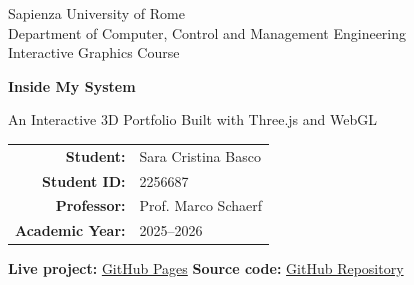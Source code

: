 \documentclass{report}
\begin{document}
\begin{titlepage}
    \thispagestyle{empty}

    \begin{center}

        \vspace{0.6cm}

        {\large
        Sapienza University of Rome\\
        Department of Computer, Control and Management Engineering\\
        Interactive Graphics Course
        }

        \vspace{1.8cm}

        {\fontsize{32}{38}\selectfont
        \bfseries
        \textcolor{projectdark}{Inside My System}
        }

        \vspace{0.35cm}

        {\Large
        \textcolor{projectgold}{
        An Interactive 3D Portfolio Built with Three.js and WebGL
        }
        }

        \vspace{1.3cm}

        \vfill

        \begin{tabular}{rl}
            \textbf{Student:} &
            Sara Cristina Basco \\[0.15cm]

            \textbf{Student ID:} &
            2256687 \\[0.15cm]

            \textbf{Professor:} &
            Prof. Marco Schaerf \\[0.15cm]

            \textbf{Academic Year:} &
            2025--2026
        \end{tabular}

        \vspace{0.8cm}

        {\small
        \textbf{Live project:}
        \href{https://sapienzainteractivegraphicscourse.github.io/final-project-karu_akai/}{GitHub Pages}
        \hspace{1cm}
        \textbf{Source code:}
        \href{https://github.com/SapienzaInteractiveGraphicsCourse/final-project-karu_akai}{GitHub Repository}
        }

        \vspace{0.4cm}

    \end{center}
\end{titlepage}
\end{document}
